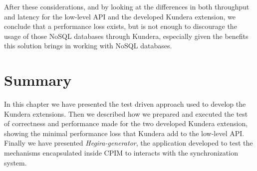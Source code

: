 \newparagraph After these considerations, and by looking at the differences in both throughput and latency for the low-level API and the developed Kundera extension, we conclude that a performance loss exists, but is not enough to discourage the usage of those NoSQL databases through Kundera, especially given the benefits this solution brings in working with NoSQL databases.

\section{Summary}
In this chapter we have presented the test driven approach used to develop the Kundera extensions. Then we described how we prepared and executed the test of correctness and performance made for the two developed Kundera extension, showing the minimal performance loss that Kundera add to the low-level API.
Finally we have presented \textit{Hegira-generator}, the application developed to test the mechanisms encapsulated inside CPIM to interacts with the synchronization system.
